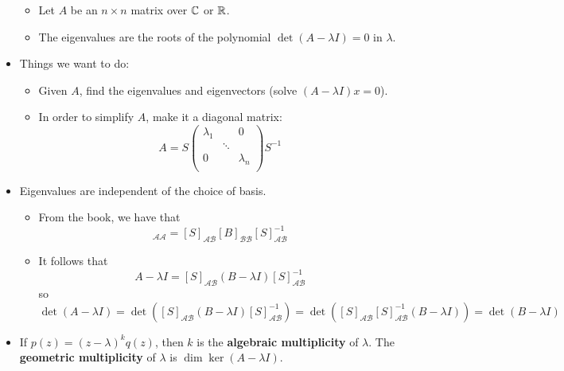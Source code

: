 \documentclass[../../notes.tex]{subfiles}
\begin{document}
\begin{itemize}
    \begin{itemize}
        \item Let $A$ be an $n\times n$ matrix over $\mathbb{C}$ or $\mathbb{R}$.
        \item The eigenvalues are the roots of the polynomial $\det(A-\lambda I)=0$ in $\lambda$.
    \end{itemize}
    \item Things we want to do:
    \begin{itemize}
        \item Given $A$, find the eigenvalues and eigenvectors (solve $(A-\lambda I)x=0$).
        \item In order to simplify $A$, make it a diagonal matrix:
        \begin{equation*}
            A = S
            \begin{pmatrix}
                \lambda_1 &  & 0\\
                 & \ddots & \\
                0 &  & \lambda_n\\
            \end{pmatrix}
            S^{-1}
        \end{equation*}
    \end{itemize}
    \item Eigenvalues are independent of the choice of basis.
    \begin{itemize}
        \item From the book, we have that
        \begin{equation*}
            [A]_{\mathcal{A}\mathcal{A}} = [S]_{\mathcal{A}\mathcal{B}}[B]_{\mathcal{B}\mathcal{B}}[S]_{\mathcal{A}\mathcal{B}}^{-1}
        \end{equation*}
        \item It follows that
        \begin{equation*}
            A-\lambda I = [S]_{\mathcal{A}\mathcal{B}}(B-\lambda I)[S]_{\mathcal{A}\mathcal{B}}^{-1}
        \end{equation*}
        so
        \begin{equation*}
            \det(A-\lambda I) = \det([S]_{\mathcal{A}\mathcal{B}}(B-\lambda I)[S]_{\mathcal{A}\mathcal{B}}^{-1})
            = \det([S]_{\mathcal{A}\mathcal{B}}[S]_{\mathcal{A}\mathcal{B}}^{-1}(B-\lambda I))
            = \det(B-\lambda I)
        \end{equation*}
    \end{itemize}
    \item If $p(z)=(z-\lambda)^kq(z)$, then $k$ is the \textbf{algebraic multiplicity} of $\lambda$. The \textbf{geometric multiplicity} of $\lambda$ is $\dim\ker(A-\lambda I)$.

\end{itemize}
\end{document}
